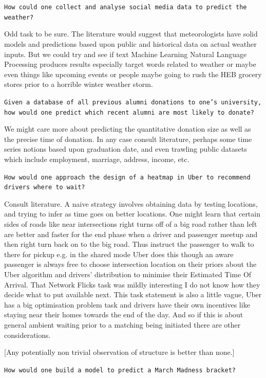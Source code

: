 \texttt{How could one collect and analyse social media data to predict the weather?}

Odd task to be sure. The literature would suggest that meteorologists have solid models and predictions based upon public and historical data on actual weather inputs. But we could try and see if text Machine Learning Natural Language Processing produces results especially target words related to weather or maybe even things like upcoming events or people maybe going to rush the HEB grocery stores prior to a horrible winter weather storm.

\texttt{Given a database of all previous alumni donations to one's university, how would one predict which recent alumni are most likely to donate?}

We might care more about predicting the quantitative donation size as well as the precise time of donation. In any case consult literature, perhaps some time series notions based upon graduation date, and even trawling public datasets which include employment, marriage, address, income, etc.

\texttt{How would one approach the design of a heatmap in Uber to recommend drivers where to wait?}

Consult literature. A naive strategy involves obtaining data by testing locations, and trying to infer as time goes on better locations. One might learn that certain sides of roads like near intersections right turns off of a big road rather than left are better and faster for the end phase when a driver and passenger meetup and then right turn back on to the big road. Thus instruct the passenger to walk to there for pickup e.g. in the shared mode Uber does this though an aware passenger is always free to choose intersection location on their priors about the Uber algorithm and drivers' distribution to minimise their Estimated Time Of Arrival. That Network Flicks task was mildly interesting I do not know how they decide what to put available next. This task statement is also a little vague, Uber has a big optimisation problem task and drivers have their own incentives like staying near their homes towards the end of the day. And so if this is about general ambient waiting prior to a matching being initiated there are other considerations.

[Any potentially non trivial observation of structure is better than none.]

\texttt{How would one build a model to predict a March Madness bracket?}


